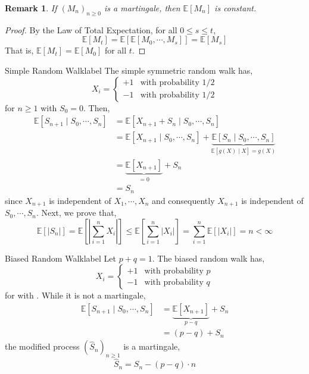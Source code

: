 \documentclass{tufte-handout}
\newtheorem{rmk}[thm]{Remark}
\begin{document}
\begin{rmk}
  If $(M_n)_{n \geq 0}$ is a martingale, then $\mathbb{E}[M_n]$ is constant.
\end{rmk}

\begin{proof}
  By the Law of Total Expectation, for all $0 \leq s \leq t$,
  \[\mathbb{E}[M_t] = \mathbb{E}[\mathbb{E}[M_0, \cdots, M_s]] = \mathbb{E}[M_s]\]
  \noindent That is, $\mathbb{E}[M_t] = \mathbb{E}[M_0]$ for all $t$.
\end{proof}

\begin{ex}{Simple Random Walk}{label}
  The simple symmetric random walk  has,
  \[
  X_i = \begin{cases}
    +1 & \text{with probability $1/2$} \\
    -1 & \text{with probability $1/2$}
  \end{cases}
  \]
  \noindent for $n \geq 1$ with $S_0 = 0$. Then,
  \begin{align*}
    \mathbb{E}[S_{n+1} \mid S_0, \cdots, S_n] &= \mathbb{E}[X_{n+1} + S_n \mid S_0, \cdots, S_n] \\
                                              &= \mathbb{E}[X_{n+1} \mid S_0, \cdots, S_n] + \underbrace{\mathbb{E}[S_n \mid S_0, \cdots, S_n]}_{\mathbb{E}[g(X) \mid X] = g(X)} \\
                                              &= \underbrace{\mathbb{E}[X_{n+1}]}_{= 0} + S_n \\
                                              &= S_n
  \end{align*}
  \noindent since $X_{n+1}$ is independent of $X_1, \cdots, X_n$ and consequently $X_{n+1}$ is independent of $S_0, \cdots, S_n$. Next, we prove that,
  \[\mathbb{E}[|S_n|] = \mathbb{E}\left[ \left|\sum_{i=1}^n X_i\right|\right] \leq \mathbb{E}\left[ \sum_{i=1}^n |X_i|\right] = \sum_{i=1}^n \mathbb{E}[|X_i|] = n < \infty\]
\end{ex}

\begin{ex}{Biased Random Walk}{label}
  Let $p + q = 1$. The biased random walk  has,
  \[
  X_i = \begin{cases}
    +1 & \text{with probability $p$} \\
    -1 & \text{with probability $q$}
  \end{cases}
  \]
  \noindent for  with . While it is not a martingale,
  \begin{align*}
    \mathbb{E}[S_{n+1} \mid S_0, \cdots, S_n] &= \underbrace{\mathbb{E}[X_{n+1}]}_{p - q} + S_n \\
                                              &= (p - q) + S_n
  \end{align*}
  \noindent the modified process $(\hat{S}_n)_{n\geq 1}$ is a martingale,
  \[
  \hat{S}_n = S_n - (p - q) \cdot n
  \]
\end{ex}
\end{document}
